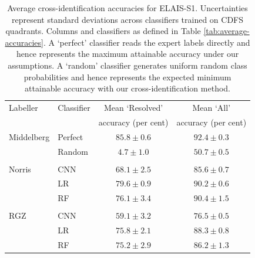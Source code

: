 \documentclass[fleqn,usenatbib,usedcolumn]{mnras}
\begin{document}
\begin{table}
  \caption{Average cross-identification accuracies for ELAIS-S1.
    Uncertainties represent standard deviations across classifiers trained
    on CDFS quadrants. Columns and classifiers as defined in Table
    \ref{tab:average-accuracies}.  A `perfect' classifier reads the expert
    labels directly and hence represents the maximum attainable accuracy
    under our assumptions. A `random' classifier generates uniform random
    class probabilities and hence represents the expected minimum attainable
    accuracy with our cross-identification method.}
    \label{tab:cross-id-accuracies-elais}
  \begin{tabular}{llcc}
    \hline
    Labeller & Classifier  & Mean `Resolved' & Mean `All' \\
     & & accuracy (per cent) & accuracy (per cent)\\
    \hline
    Middelberg & Perfect & $85.8 \pm 0.6$ & $92.4 \pm 0.3$\\
               & Random  & $4.7 \pm 1.0$  & $50.7 \pm 0.5$\\
     \\
    Norris & CNN     & $68.1 \pm 2.5$ & $85.6 \pm 0.7$\\
           & LR      & $79.6 \pm 0.9$ & $90.2 \pm 0.6$\\
           & RF      & $76.1 \pm 3.4$ & $90.4 \pm 1.5$\\
     \\
    RGZ & CNN & $59.1 \pm 3.2$ & $76.5 \pm 0.5$\\
        & LR  & $75.8 \pm 2.1$ & $88.3 \pm 0.8$\\
        & RF  & $75.2 \pm 2.9$ & $86.2 \pm 1.3$\\
     \hline
  \end{tabular}
\end{table}
\end{document}
